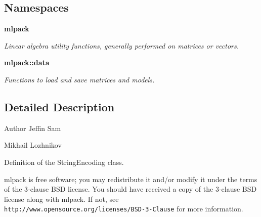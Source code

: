 \subsection*{Namespaces}
\begin{DoxyCompactItemize}
\item 
 \textbf{ mlpack}
\begin{DoxyCompactList}\small\item\em Linear algebra utility functions, generally performed on matrices or vectors. \end{DoxyCompactList}\item 
 \textbf{ mlpack\+::data}
\begin{DoxyCompactList}\small\item\em Functions to load and save matrices and models. \end{DoxyCompactList}\end{DoxyCompactItemize}


\subsection{Detailed Description}
\begin{DoxyAuthor}{Author}
Jeffin Sam 

Mikhail Lozhnikov
\end{DoxyAuthor}
Definition of the String\+Encoding class.

mlpack is free software; you may redistribute it and/or modify it under the terms of the 3-\/clause B\+SD license. You should have received a copy of the 3-\/clause B\+SD license along with mlpack. If not, see {\tt http\+://www.\+opensource.\+org/licenses/\+B\+S\+D-\/3-\/\+Clause} for more information. 